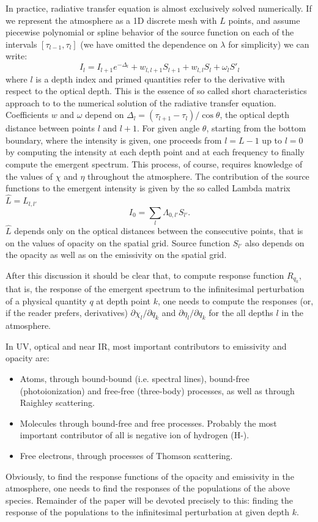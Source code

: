 \documentclass[referee]{aa}
\begin{document}
In practice, radiative transfer equation is almost exclusively solved numerically. If we represent the atmosphere as a 1D discrete mesh with $L$ points, and assume piecewise polynomial or spline behavior of the source function on each of the intervals $[\tau_{l-1},\tau_l]$ (we have omitted the dependence on $\lambda$ for simplicity) we can write:
\begin{equation}
 I_l = I_{l+1} e^{-\Delta_l} + w_{l,l+1} S_{l+1} + w_{l,l} S_{l} + \omega_{l} S'_{l}
 \label{SC}
\end{equation}
where $l$ is a depth index and primed quantities refer to the derivative with respect to the optical depth. This is the essence of so called short characteristics approach to to the numerical solution of the radiative transfer equation\citep{OK87}. Coefficients $w$ and $\omega$ depend on $\Delta_l = (\tau_{l+1} - \tau_l)/\cos\theta$, the optical depth distance between points $l$ and $l+1$. For given angle $\theta$, starting from the bottom boundary, where the intensity is given, one proceeds from $l = L-1$ up to $l=0$ by computing the intensity at each depth point and at each frequency to finally compute the emergent spectrum. This process, of course, requires knowledge of the values of $\chi$ and $\eta$ throughout the atmosphere. The contribution of the source functions to the emergent intensity is given by the so called Lambda matrix $\hat{L} = L_{l,l'}$
\begin{equation}
 I_0 = \sum_l \Lambda_{0,l'} S_{l'}.
 \label{lambdamatrix}
\end{equation}
$\hat{L}$ depends only on the optical distances between the consecutive points, that is on the values of opacity on the spatial grid. Source function $S_{l'}$ also depends on the opacity as well as on the emissivity on the spatial grid. 

After this discussion it should be clear that, to compute response function $R_{q_k}$, that is, the response of the emergent spectrum to the infinitesimal perturbation of a physical quantity $q$ at depth point $k$, one needs to compute the responses (or, if the reader prefers, derivatives) $\partial \chi_l / \partial q_k$ and $\partial \eta_l / \partial q_k$ for the all depths $l$ in the atmosphere.

In UV, optical and near IR, most important contributors to emissivity and opacity are:
\begin{itemize}
 \item Atoms, through bound-bound (i.e. spectral lines), bound-free (photoionization) and free-free (three-body) processes, as well as through Raighley scattering.
 \item Molecules through bound-free and free processes. Probably the most important contributor of all is negative ion of hydrogen (H-).
 \item Free electrons, through processes of Thomson scattering. 
\end{itemize}
Obviously, to find the response functions of the opacity and emissivity in the atmosphere, one needs to find the responses of the populations of the above species. Remainder of the paper will be devoted precisely to this: finding the response of the populations to the infinitesimal perturbation at given depth $k$.
\end{document}
